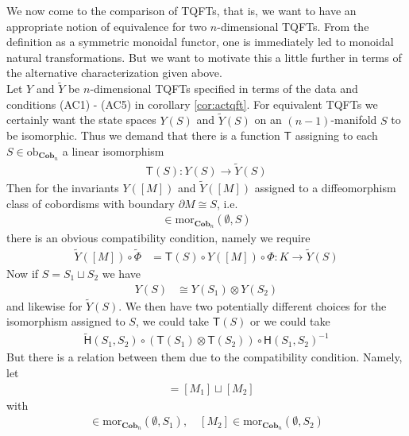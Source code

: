 \nocite{0a816f4c}
We now come to the comparison of TQFTs, that is, we want to have an appropriate notion of equivalence for two $n$-dimensional TQFTs. From the definition as a symmetric monoidal functor, one is immediately led to monoidal natural transformations. But we want to motivate this a little further in terms of the alternative characterization given above.
\\
Let $Y$ and $\tilde{Y}$ be $n$-dimensional TQFTs specified in terms of the data and conditions (AC1) - (AC5) in corollary \ref{cor:actqft}. For equivalent TQFTs we certainly want the state spaces $Y(S)$ and $\tilde{Y}(S)$ on an $(n - 1)$-manifold $S$ to be isomorphic. Thus we demand that there is a function $\mathsf{T}$ assigning to each $S \in \mathrm{ob}_{\mathbf{Cob}_{n}}$ a linear isomorphism
\begin{align*}
  \mathsf{T}(S)
  \colon
  Y(S)
  \to
  \tilde{Y}(S)
\end{align*}
Then for the invariants $Y([M])$ and $\tilde{Y}([M])$ assigned to a diffeomorphism class of cobordisms with boundary $\partial M \cong S$, i.e.
\begin{align*}
  [M]
  \in
  \mathrm{mor}_{\mathbf{Cob}_{n}}(\emptyset,S)
\end{align*}
there is an obvious compatibility condition, namely we require
\begin{align*}
  \tilde{Y}([M])
  \circ
  \tilde{\Phi}
  &=
  \mathsf{T}(S)
  \circ
  Y([M])
  \circ
  \Phi
  \colon
  K
  \to
  \tilde{Y}(S)
\end{align*}
Now if $S = S_{1} \sqcup S_{2}$ we have
\begin{align*}
  Y(S)
  &\cong
  Y(S_{1})
  \otimes
  Y(S_{2})
\end{align*}
and likewise for $\tilde{Y}(S)$. We then have two potentially different choices for the isomorphism assigned to $S$, we could take $\mathsf{T}(S)$ or we could take
\begin{align*}
  \tilde{\mathsf{H}}(S_{1},S_{2})
  \circ
  \left(
    \mathsf{T}(S_{1})
    \otimes
    \mathsf{T}(S_{2})
  \right)
  \circ
  \mathsf{H}(S_{1},S_{2})^{-1}
\end{align*}
But there is a relation between them due to the compatibility condition. Namely, let
\begin{align*}
  [M]
  &=
  [M_{1}]
  \sqcup
  [M_{2}]
\end{align*}
with
\begin{align*}
  [M_{1}]
  \in
  \mathrm{mor}_{\mathbf{Cob}_{n}}(\emptyset,S_{1})
  ,\quad
  [M_{2}]
  \in
  \mathrm{mor}_{\mathbf{Cob}_{n}}(\emptyset,S_{2})
\end{align*}
